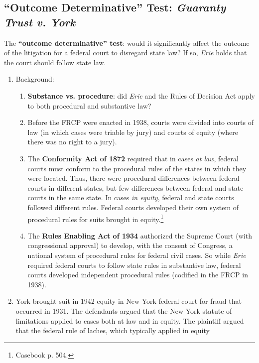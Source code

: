 \subsection{``Outcome Determinative'' Test: \emph{Guaranty Trust v. York}}

The \textbf{``outcome determinative'' test}: would it significantly 
affect the outcome of the litigation for a federal court to disregard state 
law? If so, \emph{Erie} holds that the court should follow state law.

\begin{enumerate}
    \item Background:
    \begin{enumerate}
        \item \textbf{Substance vs. procedure}: did \emph{Erie} and the Rules 
        of Decision Act apply to both procedural and substantive law?
        \item Before the FRCP were enacted in 1938, courts were divided into 
        courts of law (in which cases were triable by jury) and courts of 
        equity (where there was no right to a jury).
        \item The \textbf{Conformity Act of 1872} required that in cases 
        \emph{at law}, federal courts must conform to the procedural rules of 
        the states in which they were located. Thus, there were procedural 
        differences between federal courts in different states, but few 
        differences between federal and state courts in the same state. In 
        cases \emph{in equity}, federal and state courts followed different 
        rules. Federal courts developed their own system of procedural rules 
        for suits brought in equity.\footnote{Casebook p.  504.}
        \item The \textbf{Rules Enabling Act of 1934} authorized the Supreme 
        Court (with congressional approval) to develop, with the consent of 
        Congress, a national system of procedural rules for federal civil 
        cases. So while \emph{Erie} required federal courts to follow state 
        rules in substantive law, federal courts developed independent 
        procedural rules (codified in the FRCP in 1938).
    \end{enumerate}
    \item York brought suit in 1942 equity in New York federal court for fraud 
    that occurred in 1931. The defendants argued that the New York statute of 
    limitations applied to cases both at law and in equity. The plaintiff 
    argued that the federal rule of laches, which typically applied in equity 

\end{enumerate}
